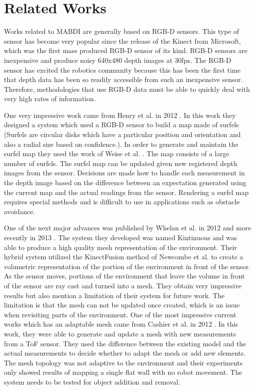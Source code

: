 \section{Related Works}	\label{sec:related_works}

Works related to MABDI are generally based on RGB-D sensors. This type of sensor has
become very popular since the release of the Kinect from Microsoft, which
was the first mass produced RGB-D sensor of its kind. RGB-D sensors are
inexpensive and produce noisy 640x480 depth images at 30fps. The RGB-D
sensor has excited the robotics community because this has been the first
time that depth data has been so readily accessible from such an
inexpensive sensor. Therefore, methodologies that use RGB-D data must be able to quickly
deal with very high rates of information.

One very impressive work came from Henry et al. in 2012 \cite{Henry2012}. In
this work they designed a system which used a RGB-D sensor to build a map made
of surfels (Surfels are circular disks which have a particular position and
orientation and also a radial size based on confidence.). In order to generate
and maintain the surfel map they used the work of Weise et al. \cite{Weise2009}.
The map consists of a large number of surfels. The surfel map can be updated
given new registered depth images from the sensor. Decisions are made how
to handle each measurement in the depth image based on the difference between an
expectation generated using the current map and the actual readings from the
sensor. Rendering a surfel map requires special methods \cite{Pfister2000} and
is difficult to use in applications such as obstacle avoidance.

One of the next major advances was published by Whelan
et al. in 2012 \cite{Whelan2012} and more recently in 2013
\cite{Whelan12tr}. The system they developed was named Kintinuous and was
able to produce a high quality mesh representation of the environment.
Their hybrid system utilized the KinectFusion method
\cite{Newcombe2011a} of Newcombe et al. to create a volumetric
representation of the portion of the environment in front of the sensor. As
the sensor moves, portions of the environment that leave the volume in
front of the sensor are ray cast and turned into a mesh. They obtain very
impressive results but also mention a limitation of their system for future
work. The limitation is that the mesh can not be updated once created,
which is an issue when revisiting parts of the environment. One of the most
impressive current works which has an adaptable mesh came from Cashier et
al. in 2012 \cite{Cahier2012}. In this work, they were able to generate and
update a mesh with new measurements from a ToF sensor. They used the
difference between the existing model and the actual measurements to decide
whether to adapt the mesh or add new elements. The mesh topology was not
adaptive to the environment and their experiments only showed results of mapping a
single flat wall with no robot movement. The system needs to be tested for
object addition and removal.

